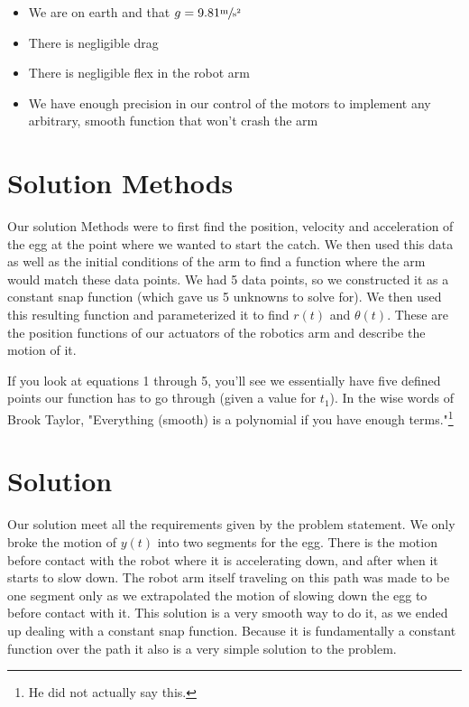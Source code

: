 \documentclass[nofoot,pdf-a,balance,colorlinks,upint,subscriptcorrection,varvw,mathalfa=cal=boondoxo]{asmeconf}
\begin{document}
	\begin{itemize}
        \item We are on earth and that $g = 9.81 \sfrac{\textrm{m}}{\textrm{s}^2}$
		\item There is negligible drag
		\item There is negligible flex in the robot arm
        \item We have enough precision in our control of the motors to implement any arbitrary, smooth function that won't crash the arm
	\end{itemize}

	\section*{Solution Methods}
	
		Our solution Methods were to first find the position, velocity and acceleration of the egg at the point where we wanted to start the catch. We then used this data as well as the initial conditions of the arm to find a function where the arm would match these data points. We had 5 data points, so we constructed it as a constant snap function (which gave us 5 unknowns to solve for). We then used this resulting function and parameterized it to find $r\left(t\right)$ and $\theta\left(t\right)$. These are the position functions of our actuators of the robotics arm and describe the motion of it.

        If you look at equations 1 through 5, you'll see we essentially have five defined points our function has to go through (given a value for $t_1$). In the wise words of Brook Taylor, "Everything (smooth) is a polynomial if you have enough terms."\footnote{He did not actually say this.}
	 
	\section*{Solution}
	
    Our solution meet all the requirements given by the problem statement. We only broke the motion of $y\left(t\right)$ into two segments for the egg. There is the motion before contact with the robot where it is accelerating down, and after when it starts to slow down. The robot arm itself traveling on this path was made to be one segment only as we extrapolated the motion of slowing down the egg to before contact with it. This solution is a very smooth way to do it, as we ended up dealing with a constant snap function. Because it is fundamentally a constant function over the path it also is a very simple solution to the problem.
\end{document}
